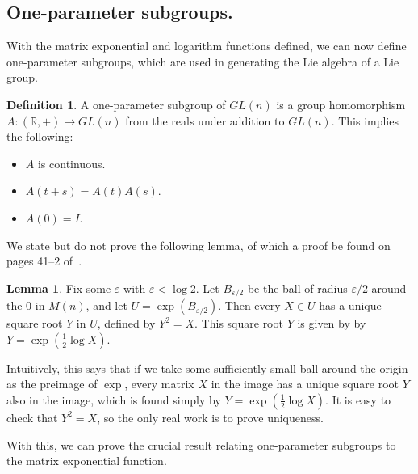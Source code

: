 \documentclass[12pt]{article}
\newcommand{\R}{\mathbb{R}}
\theoremstyle{definition}
\theoremstyle{definition}
\theoremstyle{definition}
\newtheorem{lem}[them]{Lemma}
\theoremstyle{definition}
\theoremstyle{definition}
\newtheorem{defn}[them]{Definition}
\theoremstyle{definition}
\theoremstyle{definition}
\theoremstyle{definition}
\begin{document}
\subsection{One-parameter subgroups.}

\par{With the matrix exponential and logarithm functions defined, we can now define one-parameter subgroups, which are used in generating the Lie algebra of a Lie group.}

\begin{defn}\label{def:gh}
A one-parameter subgroup of $GL(n)$ is a group
homomorphism $A: (\R, +) \to GL(n)$ from the reals
under addition to $GL(n)$. This implies the
following: 

\begin{itemize}
    \item $A$ is continuous.
    \item $A(t+s) = A(t)A(s)$.
    \item $A(0) = I$.
\end{itemize}
\end{defn}

\par{We state but do not prove the following
lemma, of which a proof be found on pages 41--2 of~\cite{Hall}.}

\begin{lem}\label{lem:sqrt} 
Fix some $\varepsilon$ with $\varepsilon < \log
2$. Let $B_{\varepsilon / 2}$ be the ball of
radius $\varepsilon / 2$ around the $0$ in $M(n)$,
and let $U = \exp(B_{\varepsilon/2})$. Then every
$X \in U$ has a unique square root $Y$ in $U$,
defined by $Y^2 = X$. This square root $Y$ is
given by by $Y = \exp(\frac{1}{2}\log X)$.
\end{lem}

\par{Intuitively, this says that if we take some
sufficiently small ball around the origin as the
preimage of $\exp$, every matrix $X$ in the image
has a unique square root $Y$ also in the image,
which is found simply by $Y = \exp(\frac{1}{2}\log
X)$. It is easy to check that $Y^2 = X$, so the
only real work is to prove uniqueness.}

\vspace{6pt}
\par{With this, we can prove the crucial result relating one-parameter subgroups to the matrix exponential function.}
\end{document}
